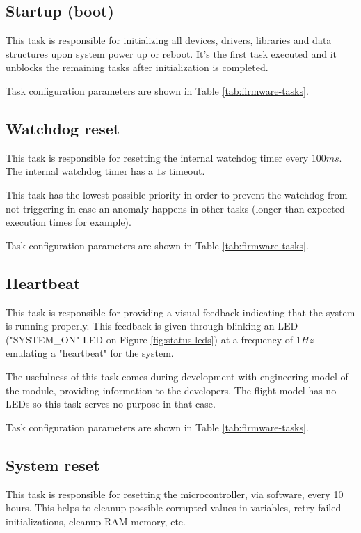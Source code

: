 \subsection{Startup (boot)}

This task is responsible for initializing all devices, drivers, libraries and data structures upon system power up or reboot.
It's the first task executed and it unblocks the remaining tasks after initialization is completed.

Task configuration parameters are shown in Table \ref{tab:firmware-tasks}.

\subsection{Watchdog reset}

This task is responsible for resetting the internal watchdog timer every \(100 ms\).
The internal watchdog timer has a \(1 s\) timeout.

This task has the lowest possible priority in order to prevent the watchdog from not triggering in case an anomaly happens in other tasks (longer than expected execution times for example).

Task configuration parameters are shown in Table \ref{tab:firmware-tasks}.

\subsection{Heartbeat}

This task is responsible for providing a visual feedback indicating that the system is running properly.
This feedback is given through blinking an LED ("SYSTEM\_ON" LED on Figure \ref{fig:status-leds}) at a frequency of \(1 Hz\) emulating a "heartbeat" for the system.

The usefulness of this task comes during development with engineering model of the module, providing information to the developers.
The flight model has no LEDs so this task serves no purpose in that case. 

Task configuration parameters are shown in Table \ref{tab:firmware-tasks}.

\subsection{System reset}

This task is responsible for resetting the microcontroller, via software, every 10 hours.
This helps to cleanup possible corrupted values in variables, retry failed initializations, cleanup RAM memory, etc.

